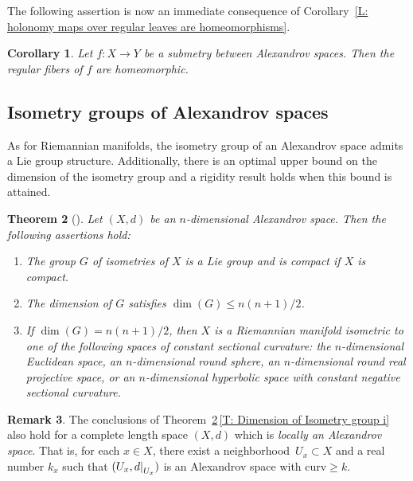 \documentclass[10pt,a4paper]{amsart}
\numberwithin{equation}{section}
\newtheorem{thm}{Theorem}[section]
\newtheorem{cor}[thm]{Corollary}
\theoremstyle{definition}
\newtheorem{rem}[thm]{Remark}
\newcommand\restr[2]{{%
		\left.\kern-\nulldelimiterspace %
		#1 %
		\right|_{#2} %
}}
\begin{document}
The following assertion is now an immediate consequence of Corollary~\ref{L: holonomy maps over regular leaves are homeomorphisms}.



 \begin{cor}\label{C: regular fibers are homeomorphic}
 Let $f\colon X\to Y$ be a submetry between Alexandrov spaces. Then the regular fibers of $f$ are homeomorphic.
 \end{cor}



\subsection{Isometry groups of Alexandrov spaces}
\label{S: Isometry group of an Alexandrov space}
As for Riemannian manifolds, the isometry group of an Alexandrov space admits a Lie group structure.
Additionally, there is an optimal upper bound on the dimension of the isometry group and a rigidity result holds when this bound is attained.

	\begin{thm}[]
	\label{T: Dimension of Isometry group}
Let $(X,d)$ be an $n$-dimensional Alexandrov space. Then the following assertions hold:
\begin{enumerate}[label=$(\arabic*)$]\itemsep=0pt
\item The group $G$ of isometries of $X$ is a Lie group and is compact if $X$ is compact.\label{T: Dimension of Isometry group i}
\item The dimension of $G$ satisfies $\dim (G) \leq n(n+1)/2$.
\item If $\dim (G) = n(n+1)/2$, then $X$ is a Riemannian manifold isometric to one of the following spaces of constant sectional curvature: the $n$-dimensional Euclidean space, an $n$-dimen\-sional round sphere, an $n$-dimensional round real projective space, or an $n$-dimensional hyperbolic space with constant negative sectional curvature.
		\end{enumerate}
\end{thm}

\begin{rem}\label{R: isometry group of local. Alexandrov space is Lie}
The conclusions of Theorem~\ref{T: Dimension of Isometry group}\,\ref{T: Dimension of Isometry group i} also hold for a complete length space $(X,d)$ which is \emph{locally an Alexandrov space}. That is, for each $x\in X$, there exist a neighborhood~${U_x\subset X}$ and a real number $k_x$ such that $(U_x,\restr{d}{U_x})$ is an Alexandrov space with $\mathrm{curv}\geq k$.
\end{rem}
\end{document}
